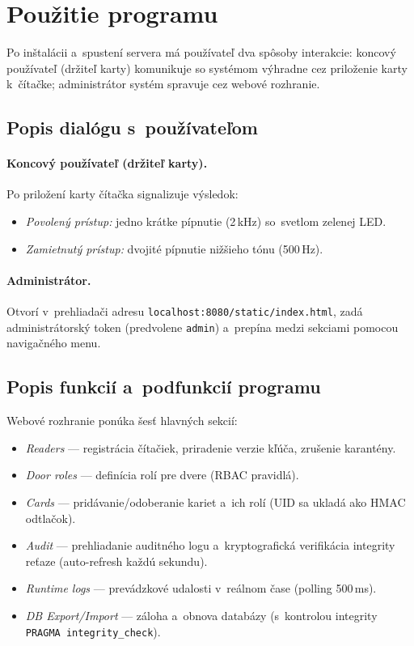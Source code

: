 \documentclass[a4paper]{feidippp}
\begin{document}
\section{Použitie programu}

Po inštalácii a~spustení servera má používateľ dva spôsoby interakcie: koncový používateľ (držiteľ karty) komunikuje so systémom výhradne cez priloženie karty k~čítačke; administrátor systém spravuje cez webové rozhranie.

\subsection{Popis dialógu s~používateľom}

\paragraph{Koncový používateľ (držiteľ karty).} Po priložení karty čítačka signalizuje výsledok:
\begin{itemize}
\item \emph{Povolený prístup:} jedno krátke pípnutie (2\,kHz) so~svetlom zelenej LED.
\item \emph{Zamietnutý prístup:} dvojité pípnutie nižšieho tónu (500\,Hz).
\end{itemize}

\paragraph{Administrátor.} Otvorí v~prehliadači adresu \texttt{localhost:8080/static/}\allowbreak\texttt{index.html}, zadá administrátorský token (predvolene \texttt{admin}) a~prepína medzi sekciami pomocou navigačného menu.

\subsection{Popis funkcií a~podfunkcií programu}

Webové rozhranie ponúka šesť hlavných sekcií:

\begin{itemize}
\item \emph{Readers} --- registrácia čítačiek, priradenie verzie kľúča, zrušenie karantény.
\item \emph{Door roles} --- definícia rolí pre dvere (RBAC pravidlá).
\item \emph{Cards} --- pridávanie/odoberanie kariet a~ich rolí (UID sa ukladá ako HMAC odtlačok).
\item \emph{Audit} --- prehliadanie auditného logu a~kryptografická verifikácia integrity reťaze (auto-refresh každú sekundu).
\item \emph{Runtime logs} --- prevádzkové udalosti v~reálnom čase (polling 500\,ms).
\item \emph{DB Export/Import} --- záloha a~obnova databázy (s~kontrolou integrity \texttt{PRAGMA integrity\_check}).
\end{itemize}
\end{document}
